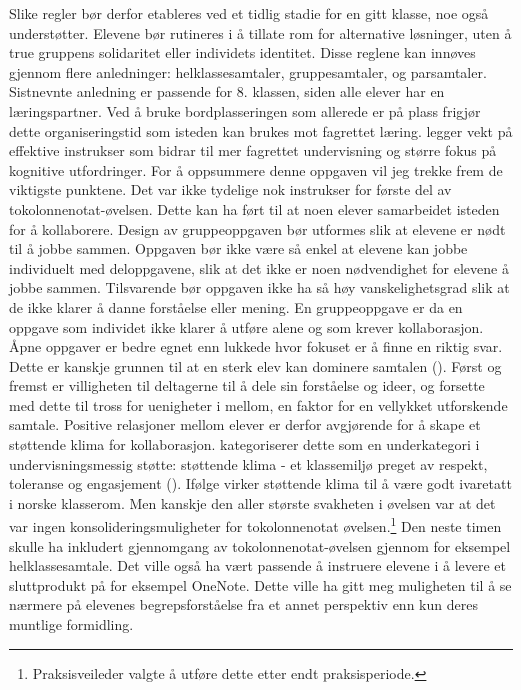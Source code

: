 \documentclass[main.tex]{subfiles}
\begin{document}
Slike regler bør derfor etableres ved et tidlig stadie for en gitt klasse, noe 
også understøtter. Elevene bør rutineres i å tillate rom for alternative løsninger, uten å true 
gruppens solidaritet eller individets identitet. Disse reglene kan innøves gjennom flere 
anledninger: helklassesamtaler, gruppesamtaler, og parsamtaler. Sistnevnte anledning er passende
for 8. klassen, siden alle elever har en læringspartner. Ved å bruke bordplasseringen som allerede 
er på plass frigjør dette organiseringstid som isteden kan brukes mot fagrettet læring. 
 legger vekt på effektive instrukser som bidrar til mer fagrettet undervisning og 
større fokus på kognitive utfordringer.
\newline
\newline
For å oppsummere denne oppgaven vil jeg trekke frem de viktigste punktene. Det var ikke tydelige 
nok instrukser for første del av tokolonnenotat-øvelsen. Dette kan ha ført til at noen elever 
samarbeidet isteden for å kollaborere. Design av gruppeoppgaven bør utformes slik at elevene er 
nødt til å jobbe sammen. Oppgaven bør ikke være så enkel at elevene kan jobbe individuelt med 
deloppgavene, slik at det ikke er noen nødvendighet for elevene å jobbe sammen. Tilsvarende 
bør oppgaven ikke ha så høy vanskelighetsgrad slik at de ikke klarer å danne forståelse eller mening. 
En gruppeoppgave er da en oppgave som individet ikke klarer å utføre alene og som 
krever kollaborasjon. Åpne oppgaver er bedre egnet enn lukkede hvor fokuset er å finne 
en riktig svar. Dette er kanskje grunnen til at en sterk elev kan dominere samtalen 
(). Først og fremst er villigheten til deltagerne til å dele sin forståelse 
og ideer, og forsette med dette til tross for uenigheter i mellom, en faktor for en vellykket 
utforskende samtale. Positive relasjoner mellom elever er derfor avgjørende for å skape et støttende 
klima for kollaborasjon.  kategoriserer dette som en underkategori i 
undervisningsmessig støtte: støttende klima - et klassemiljø preget av respekt, toleranse og 
engasjement (). Ifølge  virker støttende klima til å være 
godt ivaretatt i norske klasserom. Men kanskje den aller største svakheten i øvelsen var at det 
var ingen konsolideringsmuligheter for tokolonnenotat øvelsen.\footnote[5]{Praksisveileder valgte 
å utføre dette etter endt praksisperiode.} Den neste timen skulle ha inkludert gjennomgang av 
tokolonnenotat-øvelsen gjennom for eksempel helklassesamtale. Det ville også ha vært passende
å instruere elevene i å levere et sluttprodukt på for eksempel OneNote. Dette ville ha gitt meg
muligheten til å se nærmere på elevenes begrepsforståelse fra et annet perspektiv enn kun deres 
muntlige formidling.  
\end{document}
